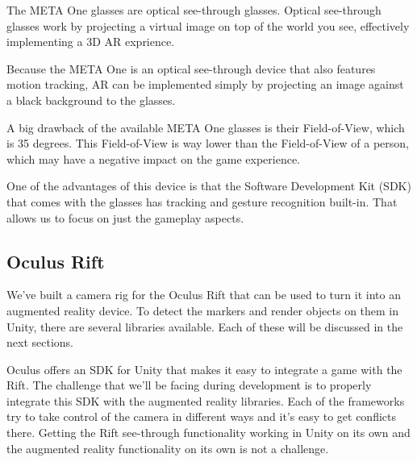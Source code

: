 			The META One glasses are optical see-through glasses. \cite{metaone}
			Optical see-through glasses work by projecting a virtual image on
			top of the world you see, effectively implementing a 3D AR
			exprience.

			Because the META One is an optical see-through device that also
			features motion tracking, AR can be implemented simply by
			projecting an image against a black background to the glasses.

			A big drawback of the available META One glasses is their
			Field-of-View, which is 35 degrees. This Field-of-View is way lower
			than the Field-of-View of a person, which may have a negative impact
			on the game experience.

			One of the advantages of this device is that the Software
			Development Kit (SDK) that comes with the glasses has tracking and
			gesture recognition built-in. That allows us to focus on just the
			gameplay aspects.

		\subsection{Oculus Rift} \label{ssec:oculusrift}
			We've built a camera rig for the Oculus Rift that can be used to
			turn it into an augmented reality device. To detect the markers and
			render objects on them in Unity, there are several libraries
			available. Each of these will be discussed in the next sections.

			Oculus offers an SDK for Unity that makes it easy to integrate a
			game with the Rift. \cite{riftdev} The challenge that we'll be
			facing during development is to properly integrate this SDK with the
			augmented reality libraries. Each of the frameworks try to take
			control of the camera in different ways and it's easy to get
			conflicts there. Getting the Rift see-through functionality working
			in Unity on its own and the augmented reality functionality on its
			own is not a challenge.

